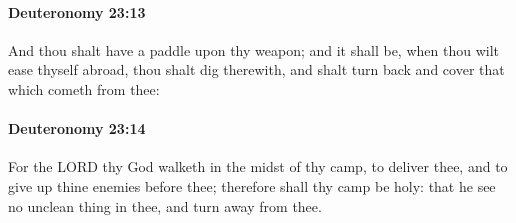 		\paragraph{Deuteronomy 23:13} %
			\label{DEUTERONOMY-23-13}

			And thou shalt have a paddle upon thy weapon; and it shall be, when thou wilt ease thyself abroad, thou shalt dig therewith, and shalt turn back and cover that which cometh from thee:


		\paragraph{Deuteronomy 23:14} %
			\label{DEUTERONOMY-23-14}

			For the LORD thy God walketh in the midst of thy camp, to deliver thee, and to give up thine enemies before thee; therefore shall thy camp be holy: that he see no unclean thing in thee, and turn away from thee.

